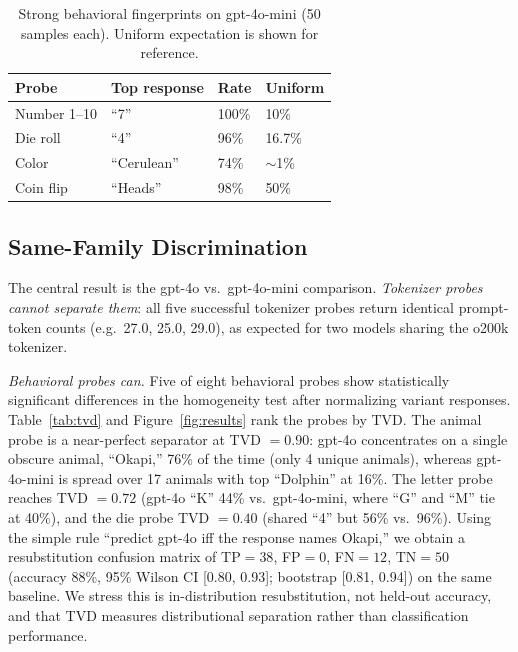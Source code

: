 \documentclass[10pt,twocolumn,letterpaper]{article}
\begin{document}
\begin{table}[t]
\centering
\small
\caption{Strong behavioral fingerprints on gpt-4o-mini (50 samples each). Uniform expectation is shown for reference.}
\label{tab:single}
\begin{tabular}{llll}
\toprule
Probe & Top response & Rate & Uniform \\
\midrule
Number 1--10 & ``7'' & 100\% & 10\% \\
Die roll & ``4'' & 96\% & 16.7\% \\
Color & ``Cerulean'' & 74\% & $\sim$1\% \\
Coin flip & ``Heads'' & 98\% & 50\% \\
\bottomrule
\end{tabular}
\end{table}

\subsection{Same-Family Discrimination}
\label{sec:same}
The central result is the gpt-4o vs.\ gpt-4o-mini comparison. \emph{Tokenizer probes cannot separate them}: all five successful tokenizer probes return identical prompt-token counts (e.g.\ 27.0, 25.0, 29.0), as expected for two models sharing the o200k tokenizer.

\emph{Behavioral probes can.} Five of eight behavioral probes show statistically significant differences in the homogeneity test after normalizing variant responses. Table~\ref{tab:tvd} and Figure~\ref{fig:results} rank the probes by TVD. The animal probe is a near-perfect separator at TVD $=0.90$: gpt-4o concentrates on a single obscure animal, ``Okapi,'' 76\% of the time (only 4 unique animals), whereas gpt-4o-mini is spread over 17 animals with top ``Dolphin'' at 16\%. The letter probe reaches TVD $=0.72$ (gpt-4o ``K'' 44\% vs.\ gpt-4o-mini, where ``G'' and ``M'' tie at 40\%), and the die probe TVD $=0.40$ (shared ``4'' but 56\% vs.\ 96\%). Using the simple rule ``predict gpt-4o iff the response names Okapi,'' we obtain a resubstitution confusion matrix of TP$=38$, FP$=0$, FN$=12$, TN$=50$ (accuracy 88\%, 95\% Wilson CI [0.80, 0.93]; bootstrap [0.81, 0.94]) on the same baseline. We stress this is in-distribution resubstitution, not held-out accuracy, and that TVD measures distributional separation rather than classification performance.
\end{document}
